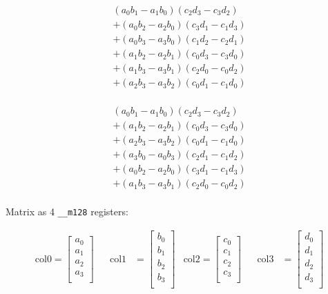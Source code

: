 \documentclass[fontsize = 10pt,DIV = 13]{scrartcl}
\newcommand{\pth}[1]{\left(#1\right)}
\begin{document}
\begin{align*}
  \pth{a_0b_1 - a_1b_0} \pth{c_2d_3 - c_3d_2}\\
+ \pth{a_0b_2 - a_2b_0} \pth{c_3d_1 - c_1d_3}\\
+ \pth{a_0b_3 - a_3b_0} \pth{c_1d_2 - c_2d_1}\\
+ \pth{a_1b_2 - a_2b_1} \pth{c_0d_3 - c_3d_0}\\
+ \pth{a_1b_3 - a_3b_1} \pth{c_2d_0 - c_0d_2}\\
+ \pth{a_2b_3 - a_3b_2} \pth{c_0d_1 - c_1d_0}\\
\end{align*}

\begin{align*}
  \pth{a_0b_1 - a_1b_0} \pth{c_2d_3 - c_3d_2}\\
+ \pth{a_1b_2 - a_2b_1} \pth{c_0d_3 - c_3d_0}\\
+ \pth{a_2b_3 - a_3b_2} \pth{c_0d_1 - c_1d_0}\\
+ \pth{a_3b_0 - a_0b_3} \pth{c_2d_1 - c_1d_2}\\
+ \pth{a_0b_2 - a_2b_0} \pth{c_3d_1 - c_1d_3}\\
+ \pth{a_1b_3 - a_3b_1} \pth{c_2d_0 - c_0d_2}\\
\end{align*}

Matrix as 4 \texttt{__m128} registers:

\begin{align*}
\mathrm{col0} 
=
\begin{bmatrix}
a_0\\
a_1\\
a_2\\
a_3\\
\end{bmatrix}
&&
\mathrm{col1} 
&=
\begin{bmatrix}
b_0\\
b_1\\
b_2\\
b_3\\
\end{bmatrix}
&
\mathrm{col2} 
=
\begin{bmatrix}
c_0\\
c_1\\
c_2\\
c_3\\
\end{bmatrix}
&&
\mathrm{col3} 
&=
\begin{bmatrix}
d_0\\
d_1\\
d_2\\
d_3\\
\end{bmatrix}
\end{align*}
\end{document}
